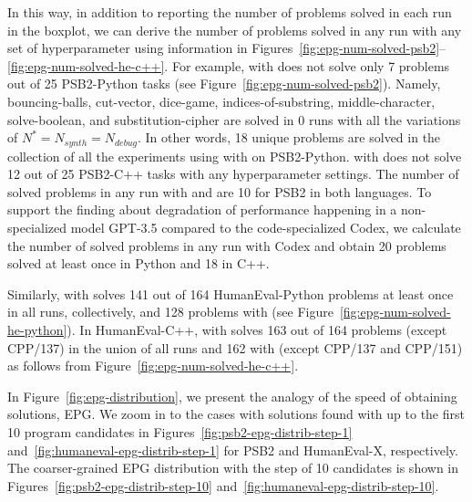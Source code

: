 In this way, in addition to reporting the number of problems solved in each run in the boxplot, we can derive the number of problems solved in any run with any set of hyperparameter using information in Figures~\ref{fig:epg-num-solved-psb2}--\ref{fig:epg-num-solved-he-c++}.
For example, \method{} with \gpt{} does not solve only 7 problems out of 25 PSB2-Python tasks (see Figure~\ref{fig:epg-num-solved-psb2}).
Namely, bouncing-balls, cut-vector, dice-game, indices-of-substring, middle-character, solve-boolean, and substitution-cipher are solved in 0 runs with all the variations of $N^*=N_{synth}=N_{debug}.$
In other words, 18 unique problems are solved in the collection of all the experiments using \method{} with \gpt{} on PSB2-Python. 
\method{} with \gpt{} does not solve 12 out of 25 PSB2-C++ tasks with any hyperparameter settings. 
The number of solved problems in any run with \method{} and \llama{} are 10 for PSB2 in both languages. 
To support the finding about degradation of performance happening in a non-specialized model GPT-3.5 compared to the code-specialized Codex, we calculate the number of solved problems in any run with Codex and obtain 20 problems solved at least once in Python and 18 in C++. 

Similarly, \method{} with \gpt{} solves 141 out of 164 HumanEval-Python problems at least once in all runs, collectively, and 128 problems with \llama{} (see Figure~\ref{fig:epg-num-solved-he-python}).
In HumanEval-C++, \method{} with \gpt{} solves 163 out of 164 problems (except CPP/137) in the union of all runs and 162 with \llama{} (except CPP/137 and CPP/151) as follows from Figure~\ref{fig:epg-num-solved-he-c++}.


In Figure~\ref{fig:epg-distribution}, we present the analogy of the speed of obtaining solutions, EPG. 
We zoom in to the cases with solutions found with up to the first 10 program candidates in Figures~\ref{fig:psb2-epg-distrib-step-1} and~\ref{fig:humaneval-epg-distrib-step-1} for PSB2 and HumanEval-X, respectively. 
The coarser-grained EPG distribution with the step of 10 candidates is shown in Figures~\ref{fig:psb2-epg-distrib-step-10} and~\ref{fig:humaneval-epg-distrib-step-10}. 


